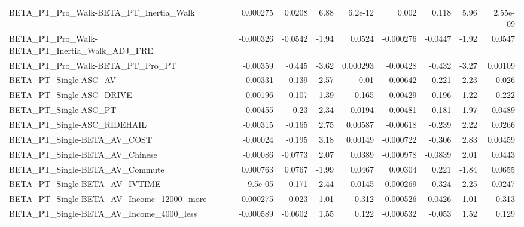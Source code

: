 \begin{tabular}{lrrrrrrrr}
BETA\_PT\_Pro\_Walk-BETA\_PT\_Inertia\_Walk              &    0.000275 &       0.0208 &     6.88 &  6.2e-12 &      0.002 &       0.118 &         5.96 &      2.55e-09 \\
BETA\_PT\_Pro\_Walk-BETA\_PT\_Inertia\_Walk\_ADJ\_FRE      &   -0.000326 &      -0.0542 &    -1.94 &   0.0524 &  -0.000276 &     -0.0447 &        -1.92 &        0.0547 \\
BETA\_PT\_Pro\_Walk-BETA\_PT\_Pro\_PT                    &    -0.00359 &       -0.445 &    -3.62 & 0.000293 &   -0.00428 &      -0.432 &        -3.27 &       0.00109 \\
BETA\_PT\_Single-ASC\_AV                              &    -0.00331 &       -0.139 &     2.57 &     0.01 &   -0.00642 &      -0.221 &         2.23 &         0.026 \\
BETA\_PT\_Single-ASC\_DRIVE                           &    -0.00196 &       -0.107 &     1.39 &    0.165 &   -0.00429 &      -0.196 &         1.22 &         0.222 \\
BETA\_PT\_Single-ASC\_PT                              &    -0.00455 &        -0.23 &    -2.34 &   0.0194 &   -0.00481 &      -0.181 &        -1.97 &        0.0489 \\
BETA\_PT\_Single-ASC\_RIDEHAIL                        &    -0.00315 &       -0.165 &     2.75 &  0.00587 &   -0.00618 &      -0.239 &         2.22 &        0.0266 \\
BETA\_PT\_Single-BETA\_AV\_COST                        &    -0.00024 &       -0.195 &     3.18 &  0.00149 &  -0.000722 &      -0.306 &         2.83 &       0.00459 \\
BETA\_PT\_Single-BETA\_AV\_Chinese                     &    -0.00086 &      -0.0773 &     2.07 &   0.0389 &  -0.000978 &     -0.0839 &         2.01 &        0.0443 \\
BETA\_PT\_Single-BETA\_AV\_Commute                     &    0.000763 &       0.0767 &    -1.99 &   0.0467 &    0.00304 &       0.221 &        -1.84 &        0.0655 \\
BETA\_PT\_Single-BETA\_AV\_IVTIME                      &    -9.5e-05 &       -0.171 &     2.44 &   0.0145 &  -0.000269 &      -0.324 &         2.25 &        0.0247 \\
BETA\_PT\_Single-BETA\_AV\_Income\_12000\_more           &    0.000275 &        0.023 &     1.01 &    0.312 &   0.000526 &      0.0426 &         1.01 &         0.313 \\
BETA\_PT\_Single-BETA\_AV\_Income\_4000\_less            &   -0.000589 &      -0.0602 &     1.55 &    0.122 &  -0.000532 &      -0.053 &         1.52 &         0.129 \\

\end{tabular}

